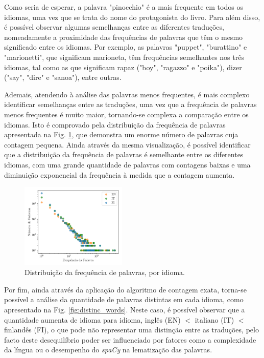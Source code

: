 \documentclass[mirror, portugues]{revdetua}
\begin{document}
Como seria de esperar, a palavra "pinocchio" é a mais frequente em todos os idiomas, uma vez que se trata do nome do protagonista do livro. Para além disso, é possível observar algumas semelhanças entre as diferentes traduções, nomeadamente a proximidade das frequências de palavras que têm o mesmo significado entre os idiomas. Por exemplo, as palavras "puppet", "burattino" e "marionetti", que significam marioneta, têm frequências semelhantes nos três idiomas, tal como as que significam rapaz ("boy", "ragazzo" e "poika"), dizer ("say", "dire" e "sanoa"), entre outras.

Ademais, atendendo à análise das palavras menos frequentes, é mais complexo identificar semelhanças entre as traduções, uma vez que a frequência de palavras menos frequentes é muito maior, tornando-se complexa a comparação entre os idiomas. Isto é comprovado pela distribuição da frequência de palavras apresentada na Fig. \ref{fig:word_freqs}, que demonstra um enorme número de palavras cuja contagem pequena. Ainda através da mesma visualização, é possível identificar que a distribuição da frequência de palavras é semelhante entre os diferentes idiomas, com uma grande quantidade de palavras com contagens baixas e uma diminuição exponencial da frequência à medida que a contagem aumenta.

\begin{figure}[H]
    \centering
    \includegraphics[width=0.45\textwidth]{../assets/exact_word_freqs.png}
    \caption{Distribuição da frequência de palavras, por idioma.}
    \label{fig:word_freqs}
\end{figure}

Por fim, ainda através da aplicação do algoritmo de contagem exata, torna-se possível a análise da quantidade de palavras distintas em cada idioma, como apresentado na Fig. \ref{fig:distinc_words}. Neste caso, é possível observar que a quantidade aumenta de idioma para idioma, inglês (EN) $<$ italiano (IT) $<$ finlandês (FI), o que pode não representar uma distinção entre as traduções, pelo facto deste desequilíbrio poder ser influenciado por fatores como a complexidade da língua ou o desempenho do \textit{spaCy} na lematização das palavras.
\end{document}
